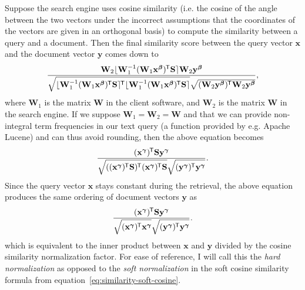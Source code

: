 \documentclass[
  digital, %
  notable, %
  lof,     %
  lot,     %
  nopalatino, color
]{fithesis3}
\let\term\emph
\newcommand*{\tran}{^{\mkern-1.5mu\mathsf{T}}}
\let\emph=\textit
\begin{document}
Suppose the search engine uses cosine similarity (i.e.
the cosine of the angle between the two vectors under the incorrect assumptions
that the coordinates of the vectors are given in an orthogonal basis)
to compute the similarity between a query and a document. Then the final
similarity score between the query vector $\mathbf x$ and the document vector
$\mathbf y$ comes down to\begin{equation*}
  \frac{\mathbf W_2\lfloor\mathbf W_1^{-1}(\mathbf W_1\mathbf x^{\bm\beta})\tran\mathbf S\rceil\mathbf W_2\mathbf y^{\bm\beta}}{\sqrt{\lfloor\mathbf W_1^{-1}(\mathbf W_1\mathbf x^{\bm\beta})\tran\mathbf S\rceil\tran\lfloor\mathbf W_1^{-1}(\mathbf W_1\mathbf x^{\bm\beta})\tran\mathbf S\rceil}\sqrt{(\mathbf W_2\mathbf y^{\bm\beta})\tran\mathbf W_2\mathbf y^{\bm\beta}}},
\end{equation*} where $\mathbf W_1$ is the matrix $\mathbf
W$ in the client software, and $\mathbf W_2$ is the matrix $\mathbf
W$ in the search engine. If we suppose $\mathbf W_1=\mathbf
W_2=\mathbf W$ and that we can provide non-integral term frequencies in our
text query (a function provided by e.g. Apache Lucene) and can thus avoid rounding, then the above equation becomes
\begin{equation*}
  \frac{(\mathbf x^{\bm\gamma})\tran\mathbf S\mathbf y^{\bm\gamma}}{\sqrt{\strut((\mathbf x^{\bm\gamma})\tran\mathbf S)\tran (\mathbf x^{\bm\gamma})\tran\mathbf S}\sqrt{\strut(\mathbf y^{\bm\gamma})\tran\mathbf y^{\bm\gamma}}}.
\end{equation*}
Since the query vector $\mathbf x$ stays constant during the retrieval, the
above equation produces the same ordering of document vectors $\mathbf y$ as
\begin{equation}
  \label{eq:similarity-query-expansion}
  \frac{(\mathbf x^{\bm\gamma})\tran\mathbf S\mathbf y^{\bm\gamma}}{\sqrt{\strut(\mathbf x^{\bm\gamma})\tran\mathbf x^{\bm\gamma}}\sqrt{\strut(\mathbf y^{\bm\gamma})\tran\mathbf y^{\bm\gamma}}}.
\end{equation}
which is equivalent to the inner product between $\mathbf x$ and $\mathbf y$
divided by the cosine similarity normalization factor.
For ease of reference, I will call this the \term{hard
normalization} as opposed to the \term{soft
normalization} in the soft cosine similarity%
 formula from
equation~\ref{eq:similarity-soft-cosine}.
\end{document}
